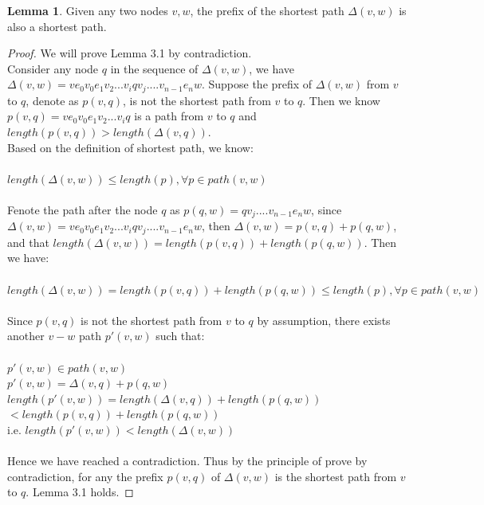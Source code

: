 \documentclass[11pt, oneside]{article}   	%
\newcommand\tab[1][1cm]{\hspace*{#1}}
\newcommand\ftab[1][5cm]{\hspace*{#1}}
\newcommand\tsp[1][0.2cm]{\hspace*{#1}}
\newcommand\htab[1][0.5cm]{\hspace*{#1}}
\theoremstyle{definition}
\newtheorem{sublemma}{Lemma}[section]
\begin{document}
\begin{sublemma}
Given any two nodes $v, w$, the prefix of the shortest path $\Delta(v, w)$ is also a shortest path. 
\end{sublemma}
\begin{proof}
We will prove Lemma 3.1 by contradiction. 
\\
Consider any node $q$ in the sequence of $\Delta(v, w)$, we have $\Delta(v, w) = ve_0v_0e_1v_2...v_i q v_j....v_{n-1}e_nw$. Suppose the prefix of $\Delta(v, w)$ from $v$ to $q$, denote as $p(v, q)$, is not the shortest path from $v$ to $q$. Then we know $p(v, q) = ve_0v_0e_1v_2...v_iq$ is a path from $v$ to $q$ and $length(p(v, q)) > length(\Delta(v, q))$. 
\\
Based on the definition of shortest path, we know: 
\\\\
\ftab $length(\Delta(v, w)) \leq length(p), \forall  p \in path(v, w)$
\\\\
Fenote the path after the node $q$ as $p(q, w) = q v_j....v_{n-1}e_nw$, since $\Delta(v, w) = ve_0v_0e_1v_2...v_i q v_j....v_{n-1}e_nw$, then $\Delta(v, w) = p(v, q) + p(q, w)$, and that $length(\Delta(v, w)) = length(p(v, q)) + length(p(q, w))$. Then we have: 
\\\\
\tab$length(\Delta(v, w)) = length(p(v, q)) + length(p(q, w)) \leq length(p), \forall p \in path(v, w)$
\\\\
Since $p(v, q)$ is not the shortest path from $v$ to $q$ by assumption, there exists another $v-w$ path $p'(v, w)$ such that: 
\\\\
\ftab $p'(v, w) \in path(v, w)$\\
\ftab $p'(v, w) = \Delta(v, q) + p(q, w)$ \\ 
\ftab $length(p'(v, w)) = length(\Delta(v, q)) + length(p(q, w))$ \\ 
\ftab\tab\tab\htab\tsp$< length(p(v, q)) + length(p(q, w))$ \\
\ftab i.e. $length(p'(v, w)) < length(\Delta(v, w))$
\\\\
Hence we have reached a contradiction. Thus by the principle of prove by contradiction, for any the prefix $p(v, q)$ of $\Delta(v, w)$ is the shortest path from $v$ to $q$. Lemma 3.1 holds. 
\end{proof}
\tab \\
\end{document}
